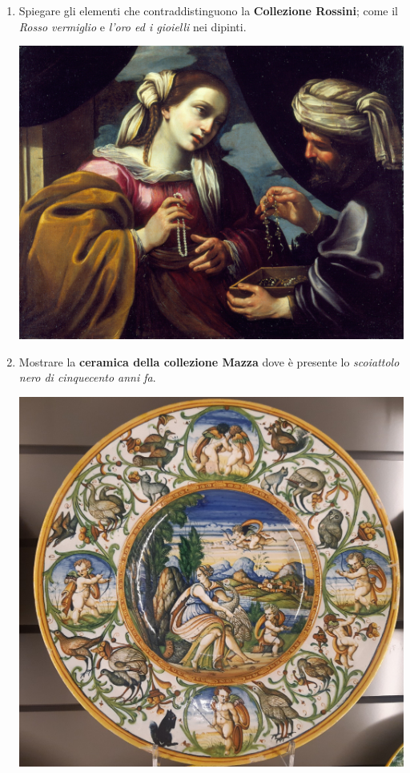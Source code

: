 \documentclass[12pt,a4paper]{article}
\begin{document}
\begin{enumerate}
	
	\item Spiegare gli elementi che contraddistinguono la \textbf{Collezione Rossini}; come il \textit{Rosso vermiglio} e \textit{l'oro ed i gioielli} nei dipinti.\par
	\begin{minipage}{\linewidth}
		\centering
		\includegraphics[scale = 0.05]{Pietro_Desani_Rebeca_y_Eleazar.jpg}
	\end{minipage}
	
	\item Mostrare la \textbf{ceramica della collezione Mazza} dove è presente lo \textit{scoiattolo nero di cinquecento anni fa}.\par
	\begin{minipage}{\linewidth}
		\centering
		\includegraphics[scale=0.6]{Piatto_Scoiattolo_Nero.jpg}
	\end{minipage}
	

\end{enumerate}
\end{document}
